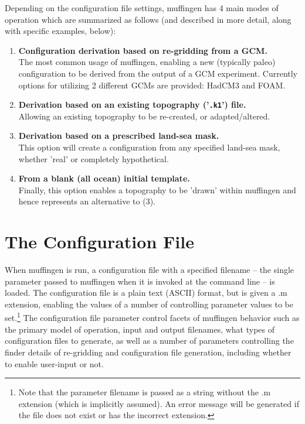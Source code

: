 \documentclass[11pt,fleqn]{book} %
\begin{document}
Depending on the configuration file settings, muffingen has 4 main modes of operation which are summarized as follows (and described in more detail, along with specific examples, below):

\begin{enumerate}[noitemsep]
\setlength{\itemindent}{.2in}
\setcounter{enumi}{0}
\item \textbf{Configuration derivation based on re-gridding from a GCM.}
\\ The most common usage of muffingen, enabling a new (typically paleo) configuration to be derived from the output of a GCM experiment. Currently options for utilizing 2 different GCMs are provided: HadCM3 and FOAM.
\item \textbf{Derivation based on an existing topography ('\texttt{.k1}') file.}
\\ Allowing an existing topography to be re-created, or adapted/altered. 
\item \textbf{Derivation based on a prescribed land-sea mask.}
\\ This option will create a configuration from any specified land-sea mask, whether 'real' or completely hypothetical. 
\item \textbf{From a blank (all ocean) initial template.}
\\ Finally, this option enables a topography to be 'drawn' within muffingen and hence represents an alternative to (3).
\end{enumerate} 


\section{The Configuration File}

When muffingen is run, a configuration file with a specified filename -- the single parameter passed to muffingen when it is invoked at the command line -- is loaded. The configuration file is a plain text (ASCII) format, but is given a .m extension, enabling the values of a number of controlling parameter values to be set.\footnote{Note that the parameter filename is passed as a string without the .m extension (which is implicitly assumed). An error message will be generated if the file does not exist or has the incorrect extension.} The configuration file parameter control facets of muffingen behavior such as the primary model of operation, input and output filenames, what types of configuration files to generate, as well as a number of parameters controlling the finder details of re-gridding and configuration file generation, including whether to enable user-input or not.
\end{document}
